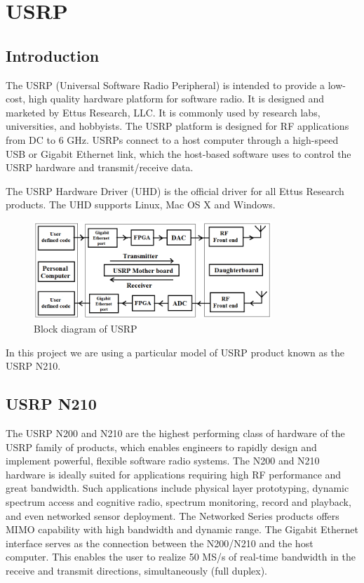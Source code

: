 \chapter{USRP}
\section{Introduction}

The USRP (Universal Software Radio Peripheral) is intended to provide a low-cost, high quality hardware platform for software radio. It is designed and marketed by Ettus Research, LLC. It is commonly used by research labs, universities, and hobbyists. The USRP platform is designed for RF applications from DC to 6 GHz. USRPs connect to a host computer through a high-speed USB or Gigabit Ethernet link, which the host-based software uses to control the USRP hardware and transmit/receive data.

The USRP Hardware Driver (UHD) is the official driver for all Ettus Research products. The UHD supports Linux, Mac OS X and Windows.

\begin{figure}[h]
\centering
\includegraphics[width=0.8\textwidth]{usrpBlock}
\caption{Block diagram of USRP}
\label{usrpBlock}
\end{figure}

In this project we are using a particular model of USRP product known as the USRP N210.

\section{USRP N210}

The USRP N200 and N210 are the highest performing class of hardware of the USRP family of products, which enables engineers to rapidly design and implement powerful, flexible software radio systems. The N200 and N210 hardware is ideally suited for applications requiring high RF performance and great bandwidth. Such applications include physical layer prototyping, dynamic spectrum access and cognitive radio, spectrum monitoring, record and playback, and even networked sensor deployment.
The Networked Series products offers MIMO capability with high bandwidth and dynamic range. The Gigabit Ethernet interface serves as the connection between the N200/N210 and the host computer. This enables the user to realize 50 MS/s of real-time bandwidth in the receive and transmit directions, simultaneously (full duplex).

